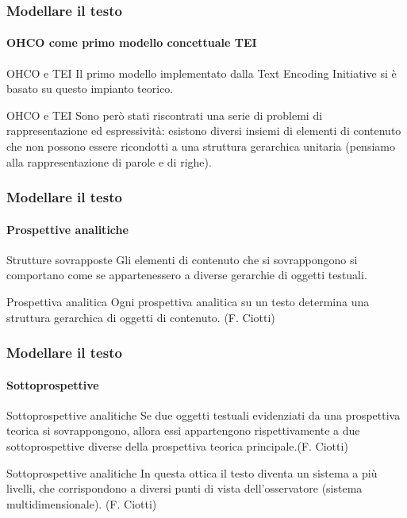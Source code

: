 \begin{frame}
	\frametitle{Modellare il testo}
	\framesubtitle{OHCO come primo modello concettuale TEI}
	\addtocounter{nframe}{1}

	\begin{block}{OHCO e TEI}
		Il primo modello implementato dalla Text Encoding Initiative si è basato su questo impianto teorico.
	\end{block}

	\begin{block}{OHCO e TEI}
		Sono però stati riscontrati una serie di problemi di rappresentazione ed espressività: esistono diversi insiemi di elementi di contenuto che non possono essere ricondotti a una struttura gerarchica unitaria (pensiamo alla rappresentazione di parole e di righe).
	\end{block}

\end{frame}

\begin{frame}
	\frametitle{Modellare il testo}
	\framesubtitle{Prospettive analitiche}
	\addtocounter{nframe}{1}

	\begin{block}{Strutture sovrapposte}
		Gli elementi di contenuto che si sovrappongono si comportano come se appartenessero a diverse gerarchie di oggetti testuali.
	\end{block}

	\begin{block}{Prospettiva analitica}
		Ogni prospettiva analitica su un testo determina una struttura gerarchica di oggetti di contenuto. (F. Ciotti)
	\end{block}
\end{frame}

\begin{frame}
	\frametitle{Modellare il testo}
	\framesubtitle{Sottoprospettive}
	\addtocounter{nframe}{1}

	\begin{block}{Sottoprospettive analitiche}
		Se due oggetti testuali evidenziati da una prospettiva teorica si sovrappongono, allora essi appartengono rispettivamente a due sottoprospettive diverse della prospettiva teorica principale.(F. Ciotti)
	\end{block}

	\begin{block}{Sottoprospettive analitiche}
		In questa ottica il testo diventa un sistema a più livelli, che corrispondono a diversi punti di vista dell’osservatore (sistema multidimensionale). (F. Ciotti)
	\end{block}

\end{frame}

